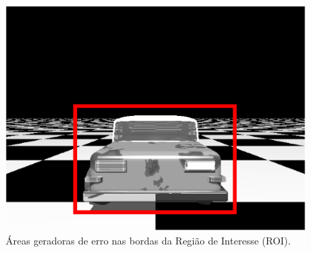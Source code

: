 \begin{figure}[H]
\includegraphics[width=\columnwidth]{images/imageError.eps}
\caption{Áreas geradoras de erro nas bordas da Região de Interesse (ROI).}
\label{fig:erroridentified}
\end{figure}

